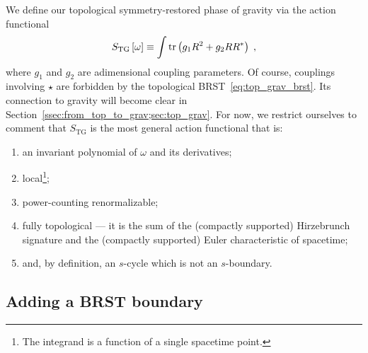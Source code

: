 \documentclass[../main.tex]{subfiles}
\begin{document}
We define our topological symmetry-restored phase of gravity via the action functional
\begin{equation}
  \label{eq:top_grav_action}
  S_{\text{TG}}\left[ \omega \right] \equiv \int \operatorname{tr} \left( g_1 R^2 + g_2 RR^* \right)\;,
\end{equation}
where $g_1$ and $g_2$ are adimensional coupling parameters. Of course, couplings involving $ \star $ are forbidden by the topological BRST~\eqref{eq:top_grav_brst}. Its connection to gravity will become clear in Section~\ref{ssec:from_top_to_grav;sec:top_grav}. For now, we restrict ourselves to comment that $S_{\text{TG}}$ is the most general action functional that is:
\begin{enumerate}[label=\roman*)] %
  \item an invariant polynomial of $\omega$ and its derivatives;
  \item local\footnote{The integrand is a function of a single spacetime point. };
  \item power-counting renormalizable;
  \item fully topological --- it is the sum of the (compactly supported) Hirzebrunch signature and the (compactly supported) Euler characteristic of spacetime;
  \item  and, by definition, an $s$-cycle which is not an $s$-boundary.
\end{enumerate}

\subsection{Adding a BRST boundary}%
\label{ssec:brst_boundary;sec:top_grav}
\end{document}
